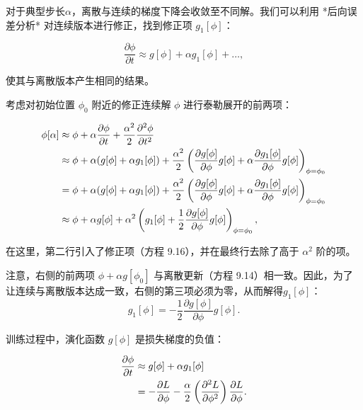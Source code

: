\documentclass[lang=cn,newtx,10pt,scheme=chinese]{elegantbook}
\begin{document}
对于典型步长\(\alpha\)，离散与连续的梯度下降会收敛至不同解。我们可以利用 *后向误差分析* 对连续版本进行修正，找到修正项 \(g_1[\phi]\)：

\begin{equation}
\frac{\partial \phi}{\partial t} \approx g[\phi] + \alpha g_1[\phi] + \ldots, 
\end{equation}

使其与离散版本产生相同的结果。

考虑对初始位置  \(\phi_0\) 附近的修正连续解 \(\phi\) 进行泰勒展开的前两项：


\begin{align}
	\phi[\alpha] &\approx \phi + \alpha \frac{\partial \phi}{\partial t} + \frac{\alpha^2}{2} \frac{\partial^2 \phi}{\partial t^2} \notag \\
	&\approx \phi + \alpha (g[\phi] + \alpha g_1[\phi]) + \frac{\alpha^2}{2} \left( \frac{\partial g[\phi]}{\partial \phi} g[\phi] + \alpha \frac{\partial g_1[\phi]}{\partial \phi} g[\phi] \right)_{\phi=\phi_0} \notag \\
	&= \phi + \alpha (g[\phi] + \alpha g_1[\phi]) + \frac{\alpha^2}{2} \left( \frac{\partial g[\phi]}{\partial \phi} g[\phi] + \alpha \frac{\partial g_1[\phi]}{\partial \phi} g[\phi] \right)_{\phi=\phi_0} \notag \\
	&\approx \phi + \alpha g[\phi] + \alpha^2 \left( g_1[\phi] + \frac{1}{2} \frac{\partial g[\phi]}{\partial \phi} g[\phi] \right)_{\phi=\phi_0} , 
\end{align} 

在这里，第二行引入了修正项（方程 9.16），并在最终行去除了高于 \(\alpha^2\) 阶的项。

注意，右侧的前两项 \(\phi + \alpha g[\phi_0]\) 与离散更新（方程 9.14）相一致。因此，为了让连续与离散版本达成一致，右侧的第三项必须为零，从而解得\(g_1[\phi]\)：
\begin{equation}
g_1[\phi] = - \frac{1}{2} \frac{\partial g[\phi]}{\partial \phi} g[\phi]. 
\end{equation}

训练过程中，演化函数 \(g[\phi]\) 是损失梯度的负值：


\begin{align}
	\frac{\partial \phi}{\partial t} &\approx g[\phi] + \alpha g_1[\phi] \notag \\
	&= -\frac{\partial L}{\partial \phi} - \frac{\alpha}{2} \left( \frac{\partial^2 L}{\partial \phi^2} \right) \frac{\partial L}{\partial \phi}. 
\end{align} 
\end{document}
